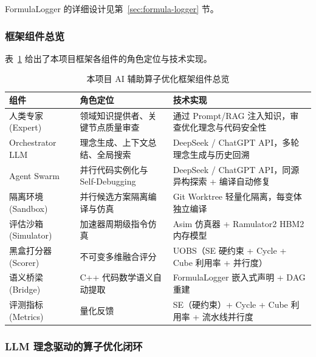 \documentclass{CjC}
\begin{document}
    FormulaLogger 的详细设计见第~\ref{sec:formula-logger} 节。

    \subsubsection{框架组件总览}

    表~\ref{tab:framework-components} 给出了本项目框架各组件的角色定位与技术实现。

    \begin{table}[H]
        \centering
        \caption{本项目 AI 辅助算子优化框架组件总览}
        \label{tab:framework-components}
        \begin{tabular}{p{3cm} p{4.5cm} p{6cm}}
            \toprule \textbf{组件}      & \textbf{角色定位}           & \textbf{技术实现}                          \\
            \midrule 人类专家 (Expert)    & 领域知识提供者、关键节点质量审查        & 通过 Prompt/RAG 注入知识，审查优化理念与代码安全性        \\
            \midrule Orchestrator LLM & 理念生成、上下文总结、全局搜索         & DeepSeek / ChatGPT API，多轮理念生成与历史回溯     \\
            \midrule Agent Swarm      & 并行代码实例化与 Self-Debugging & DeepSeek / ChatGPT API，同源异构探索 + 编译自动修复 \\
            \midrule 隔离环境 (Sandbox)   & 并行候选方案隔离编译与仿真           & Git Worktree 轻量化隔离，每变体独立编译             \\
            \midrule 评估沙箱 (Simulator) & 加速器周期级指令仿真              & Asim 仿真器 + Ramulator2 HBM2 内存模型        \\
            \midrule 黑盒打分器 (Scorer)   & 不可变多维融合评分               & UOBS（SE 硬约束 + Cycle + Cube 利用率 + 并行度）  \\
            \midrule 语义桥梁 (Bridge)    & C++ 代码数学语义自动提取          & FormulaLogger 嵌入式声明 + DAG 重建           \\
            \midrule 评测指标 (Metrics)   & 量化反馈                    & SE（硬约束）+ Cycle + Cube 利用率 + 流水线并行度     \\
            \bottomrule
        \end{tabular}
    \end{table}

    \subsubsection{LLM 理念驱动的算子优化闭环}
\end{document}
